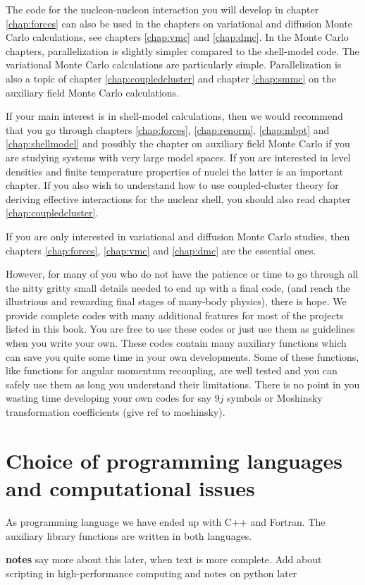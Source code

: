 The code for the nucleon-nucleon interaction you will develop in
chapter \ref{chap:forces} can also be used in the chapters on
variational and diffusion Monte Carlo calculations, see chapters
\ref{chap:vmc} and \ref{chap:dmc}.  In the Monte Carlo chapters,
parallelization is slightly simpler compared to the shell-model code.
The variational Monte Carlo calculations are particularly simple.
Parallelization is also a topic of chapter \ref{chap:coupledcluster}
and chapter \ref{chap:smmc} on the auxiliary field Monte Carlo
calculations.


If your main interest is in shell-model calculations, then we would
recommend that you go through chapters \ref{chap:forces},
\ref{chap:renorm}, \ref{chap:mbpt} and \ref{chap:shellmodel} and
possibly the chapter on auxiliary field Monte Carlo if you are
studying systems with very large model spaces.  If you are interested
in level densities and finite temperature properties of nuclei the
latter is an important chapter.  If you also wish to understand how to
use coupled-cluster theory for deriving effective interactions for the
nuclear shell, you should also read chapter \ref{chap:coupledcluster}.

If you are only interested in variational and diffusion Monte Carlo
studies, then chapters \ref{chap:forces}, \ref{chap:vmc} and
\ref{chap:dmc} are the essential ones.


However, for many of you who do not have the patience or time to go
through all the nitty gritty small details needed to end up with a
final code, (and reach the illustrious and rewarding final stages of
many-body physics), there is hope. We provide complete codes with many
additional features for most of the projects listed in this book.  You
are free to use these codes or just use them as guidelines when you
write your own. These codes contain many auxiliary functions which can
save you quite some time in your own developments.  Some of these
functions, like functions for angular momentum recoupling, are well
tested and you can safely use them as long you understand their
limitations.  There is no point in you wasting time developing your
own codes for say $9j$ symbols or Moshinsky transformation
coefficients (give ref to moshinsky).





\section{Choice of programming languages and computational issues}\label{sec:introduction_language}

As programming language we have ended up with C++ and Fortran.  The
auxiliary library functions are written in both languages.
 
{\bf notes} say more about this later, when text is more complete.
Add about scripting in high-performance computing and notes on python
later
